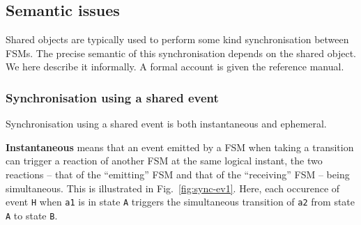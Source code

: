 \subsection*{Semantic issues}

\medskip
Shared objects are typically used to perform some kind synchronisation between FSMs. The precise semantic
of this synchronisation depends on the shared object. We here describe it informally. A formal
account is given the reference manual. 

\subsubsection*{Synchronisation using a shared event}
\label{sec:synchr-using-shar}

Synchronisation using a shared event is both instantaneous and ephemeral.

\medskip
\textbf{Instantaneous} means that an event emitted by a FSM when taking a
transition can trigger a reaction of another FSM at the same logical instant, the two reactions -- that of
the ``emitting'' FSM and that of the ``receiving'' FSM -- being simultaneous. 
This is illustrated in Fig.~\ref{fig:sync-ev1}. Here, each occurence of event \texttt{H} when
\texttt{a1} is in state \texttt{A} triggers the simultaneous transition of \texttt{a2} from state
\texttt{A} to state \texttt{B}.

